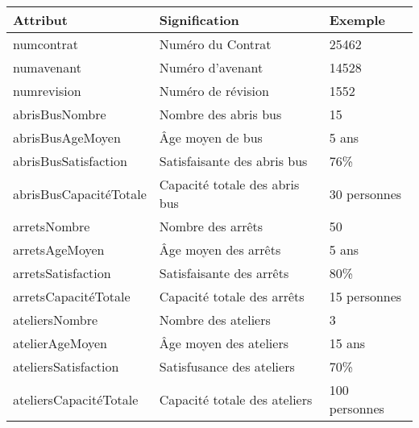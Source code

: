 	\begin{table}[H]
		\begin{center}
			\begin{tabularx}{17.5cm}{|X|X|p{2.5cm}|}
				\hline
				\textbf{Attribut}                  & \textbf{Signification}                     & \textbf{Exemple} \\
				\hline
				numcontrat                         & Numéro du Contrat                          & 25462            \\
				\hline
				numavenant                         & Numéro d'avenant                           & 14528            \\
				\hline
				numrevision                        & Numéro de révision                         & 1552             \\
				\hline
				abrisBusNombre                     & Nombre des abris bus                       & 15               \\
				\hline
				abrisBusAgeMoyen                   & Âge moyen de bus                           & 5 ans            \\
				\hline
				abrisBusSatisfaction               & Satisfaisante des abris bus                & 76\%             \\
				\hline
				abrisBusCapacitéTotale             & Capacité totale des abris bus              & 30 personnes     \\
				\hline
				arretsNombre                       & Nombre des arrêts                          & 50               \\
				\hline
				arretsAgeMoyen                     & Âge moyen des arrêts                       & 5 ans            \\
				\hline
				arretsSatisfaction                 & Satisfaisante des arrêts                   & 80\%             \\
				\hline
				arretsCapacitéTotale               & Capacité totale des arrêts                 & 15 personnes     \\
				\hline
				ateliersNombre                     & Nombre des ateliers                        & 3                \\
				\hline
				atelierAgeMoyen                    & Âge moyen des ateliers                     & 15 ans           \\
				\hline
				ateliersSatisfaction               & Satisfusance des ateliers                  & 70\%             \\
				\hline
				ateliersCapacitéTotale             & Capacité totale des ateliers               & 100 personnes    \\

\end{tabularx}
\end{center}
\end{table}
